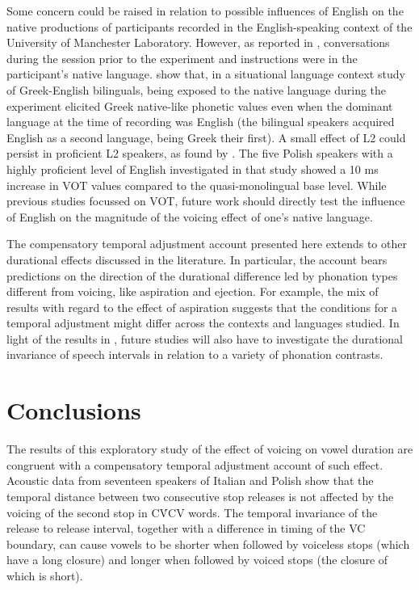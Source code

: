 \documentclass[charis]{glossa}
\begin{document}
Some concern could be raised in relation to possible influences of
English on the native productions of participants recorded in the
English-speaking context of the University of Manchester Laboratory.
However, as reported in , conversations during the
session prior to the experiment and instructions were in the
participant's native language. \citet{antoniou2010} show that, in a
situational language context study of Greek-English bilinguals, being
exposed to the native language during the experiment elicited Greek
native-like phonetic values even when the dominant language at the time
of recording was English (the bilingual speakers acquired English as a
second language, being Greek their first). A small effect of L2 could
persist in proficient L2 speakers, as found by \citet{schwartz2015}. The
five Polish speakers with a highly proficient level of English
investigated in that study showed a 10 ms increase in VOT values
compared to the quasi-monolingual base level. While previous studies
focussed on VOT, future work should directly test the influence of
English on the magnitude of the voicing effect of one's native language.

The compensatory temporal adjustment account presented here extends to
other durational effects discussed in the literature. In particular, the
account bears predictions on the direction of the durational difference
led by phonation types different from voicing, like aspiration and
ejection. For example, the mix of results with regard to the effect of
aspiration \citep{durvasula2012} suggests that the conditions for a
temporal adjustment might differ across the contexts and languages
studied. In light of the results in \citet{begus2017}, future studies
will also have to investigate the durational invariance of speech
intervals in relation to a variety of phonation contrasts.

\hypertarget{conclusions}{%
\section{Conclusions}\label{conclusions}}

The results of this exploratory study of the effect of voicing on vowel
duration are congruent with a compensatory temporal adjustment account
of such effect. Acoustic data from seventeen speakers of Italian and
Polish show that the temporal distance between two consecutive stop
releases is not affected by the voicing of the second stop in CV́CV
words. The temporal invariance of the release to release interval,
together with a difference in timing of the VC boundary, can cause
vowels to be shorter when followed by voiceless stops (which have a long
closure) and longer when followed by voiced stops (the closure of which
is short).
\end{document}
